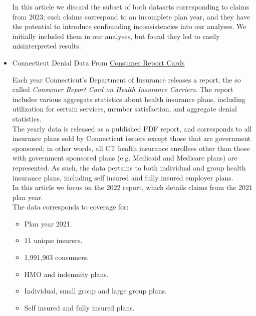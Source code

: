 \documentclass[12pt, a4paper,twoside]{report}
\theoremstyle{plain} %
\theoremstyle{definition} %
\theoremstyle{remark} %
\numberwithin{equation}{chapter}
\begin{document}
\begin{itemize}
\begin{tcolorbox}
			In this article we discard the subset of both datasets corresponding to claims from 2023; such claims correspond to an incomplete plan year, and they have the potential to introduce confounding inconsistencies into our analyses. We initially included them in our analyses, but found they led to easily misinterpreted results.
		
			\end{tcolorbox}
			
			
			\item Connecticut Denial Data From \href{https://portal.ct.gov/CID/Reports/Consumer-Report-Card-on-Health-Insurance-Carriers-in-Connecticut}{Consumer Report Cards}
			
			\begin{tcolorbox}
			
			Each year Connecticut's Department of Insurance releases a report, the so called \emph{Consumer Report Card on Health Insurance Carriers}. The report includes various aggregate statistics about health insurance plans, including utilization for certain services, member satisfaction, and aggregate denial statistics.\\
			
			The yearly data is released as a published PDF report, and corresponds to all insurance plans sold by Connecticut issuers except those that are government sponsored; in other words, all CT health insurance enrollees other than those with government sponsored plans (e.g. Medicaid and Medicare plans) are represented. As such, the data pertains to both individual and group health insurance plans, including self insured and fully insured employer plans.\\
			
			In this article we focus on the 2022 report, which details claims from the 2021 plan year.\\
			
			The data corresponds to coverage for:
			
			\begin{itemize}
				\item Plan year 2021.
				\item 11 unique insurers.
				\item 1,991,903 consumers.
				\item HMO and indemnity plans.
				\item Individual, small group and large group plans.
				\item Self insured and fully insured plans.
			\end{itemize}
			

\end{tcolorbox}
\end{itemize}
\end{document}
